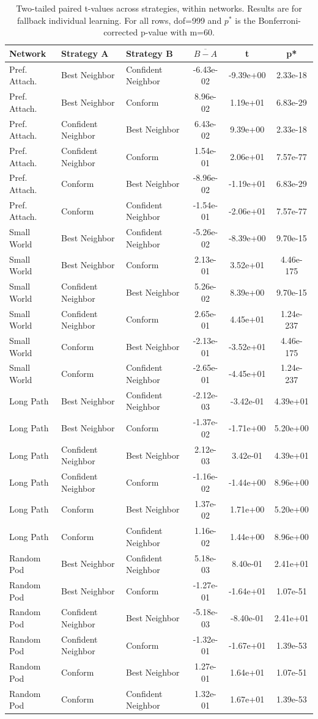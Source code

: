 \begin{table}[]
    \centering
    \begin{tabular}{l|ll|ccc}
        Network & Strategy A & Strategy B & $\overline{B - A}$ & t & p* \\
        \hline
Pref. Attach.&Best Neighbor&Confident Neighbor&-6.43e-02&-9.39e+00&2.33e-18\\
Pref. Attach.&Best Neighbor&Conform&8.96e-02&1.19e+01&6.83e-29\\
Pref. Attach.&Confident Neighbor&Best Neighbor&6.43e-02&9.39e+00&2.33e-18\\
Pref. Attach.&Confident Neighbor&Conform&1.54e-01&2.06e+01&7.57e-77\\
Pref. Attach.&Conform&Best Neighbor&-8.96e-02&-1.19e+01&6.83e-29\\
Pref. Attach.&Conform&Confident Neighbor&-1.54e-01&-2.06e+01&7.57e-77\\
\hline
Small World&Best Neighbor&Confident Neighbor&-5.26e-02&-8.39e+00&9.70e-15\\
Small World&Best Neighbor&Conform&2.13e-01&3.52e+01&4.46e-175\\
Small World&Confident Neighbor&Best Neighbor&5.26e-02&8.39e+00&9.70e-15\\
Small World&Confident Neighbor&Conform&2.65e-01&4.45e+01&1.24e-237\\
Small World&Conform&Best Neighbor&-2.13e-01&-3.52e+01&4.46e-175\\
Small World&Conform&Confident Neighbor&-2.65e-01&-4.45e+01&1.24e-237\\
\hline
Long Path&Best Neighbor&Confident Neighbor&-2.12e-03&-3.42e-01&4.39e+01\\
Long Path&Best Neighbor&Conform&-1.37e-02&-1.71e+00&5.20e+00\\
Long Path&Confident Neighbor&Best Neighbor&2.12e-03&3.42e-01&4.39e+01\\
Long Path&Confident Neighbor&Conform&-1.16e-02&-1.44e+00&8.96e+00\\
Long Path&Conform&Best Neighbor&1.37e-02&1.71e+00&5.20e+00\\
Long Path&Conform&Confident Neighbor&1.16e-02&1.44e+00&8.96e+00\\
\hline
Random Pod&Best Neighbor&Confident Neighbor&5.18e-03&8.40e-01&2.41e+01\\
Random Pod&Best Neighbor&Conform&-1.27e-01&-1.64e+01&1.07e-51\\
Random Pod&Confident Neighbor&Best Neighbor&-5.18e-03&-8.40e-01&2.41e+01\\
Random Pod&Confident Neighbor&Conform&-1.32e-01&-1.67e+01&1.39e-53\\
Random Pod&Conform&Best Neighbor&1.27e-01&1.64e+01&1.07e-51\\
Random Pod&Conform&Confident Neighbor&1.32e-01&1.67e+01&1.39e-53\\
\hline
    \end{tabular}
    \caption{Two-tailed paired t-values across strategies, within networks. Results are for fallback individual learning. For all rows, dof=999 and $p^*$ is the Bonferroni-corrected p-value with m=60.}
    \label{tab:t-innet-fallback}
\end{table}

